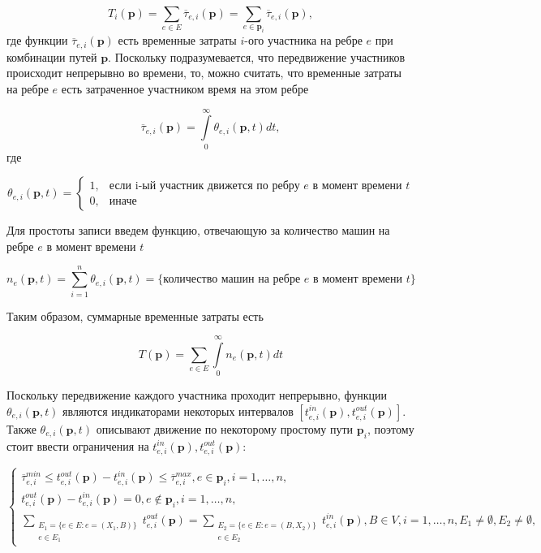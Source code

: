 \documentclass[12pt, a4paper]{article}
\begin{document}
$$T_i (\textbf{p}) = \sum \limits_{e \in E} \overline{\tau}_{e, i} (\textbf{p}) = \sum \limits_{e \in \textbf{p}_i} \overline{\tau}_{e, i} (\textbf{p}), $$
где функции $\overline{\tau}_{e, i} (\textbf{p})$ есть временные затраты $i$-ого участника на ребре $e$ при комбинации путей $\textbf{p}$. Поскольку подразумевается, что передвижение участников происходит непрерывно во времени, то, можно считать, что временные затраты на ребре $e$ есть затраченное участником время на этом ребре

$$  \overline{\tau}_{e, i} (\textbf{p}) = \int\limits_{0}^{\infty} \theta_{e, i} (\textbf{p}, t) dt, $$
где 

$$
\theta_{e, i} (\textbf{p}, t) =
\begin{cases}
	1, & \text{если}  \text{ i-ый участник движется по ребру $e$ в момент времени $t$}  \\
	0, & \text{иначе}
\end{cases}
$$

Для простоты записи введем функцию, отвечающую за количество машин на ребре $e$ в момент времени $t$

$$n_e(\textbf{p}, t) = \sum \limits_{i = 1}^n \theta_{e, i} (\textbf{p}, t) = \{\text{количество машин на ребре } e \text { в момент времени } t\}$$

Таким образом, суммарные временные затраты есть 

\begin{equation}
\label{eq:target_func_n_e}
T(\textbf{p}) = \sum \limits_{e \in E} \int\limits_{0}^{\infty} n_e (\textbf{p}, t) dt
\end{equation}

Поскольку передвижение каждого участника проходит непрерывно, функции $\theta_{e, i} (\textbf{p}, t)$ являются индикаторами некоторых интервалов $[t_{e, i}^{in} (\textbf{p}), t_{e, i}^{out} (\textbf{p})]$. Также $\theta_{e, i} (\textbf{p}, t)$ описывают движение по некоторому простому пути $\textbf{p}_i$, поэтому стоит ввести ограничения на $t_{e, i}^{in} (\textbf{p}), t_{e, i}^{out} (\textbf{p})$:

\begin{equation}
\label{eq:restr_t}
 \begin{cases}
	\overline{\tau}_{e, i}^{min} \le t_{e, i}^{out}(\textbf{p}) - t_{e, i}^{in}(\textbf{p}) \le \overline{\tau}_{e, i}^{max}, e \in \textbf{p}_i, i = 1, \dots, n,
	\\
	t_{e, i}^{out}(\textbf{p}) - t_{e, i}^{in}(\textbf{p}) = 0, e \notin \textbf{p}_i, i = 1, \dots, n,
	\\
	 \sum \limits_{ \substack{E_1 = \{ e \in E: e = (X_1, B) \} \\ e \in E_1}} t_{e, i}^{out} (\textbf{p}) = \sum \limits_{ \substack{E_2 = \{ e \in E: e = (B, X_2) \} \\ e \in E_2}} t_{e, i}^{in} (\textbf{p}), B \in V, i = 1, \dots, n, E_1 \ne \emptyset, E_2 \ne \emptyset,
\end{cases}
\end{equation}
\end{document}
